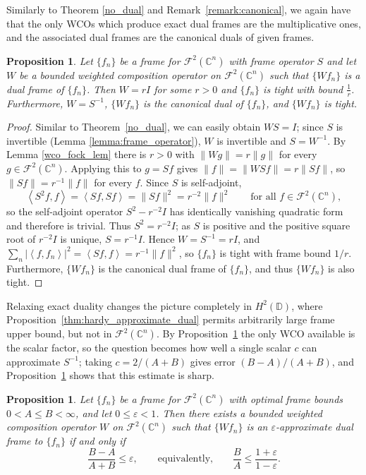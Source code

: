 \documentclass{amsart}
\newtheorem{prop}[thm]{Proposition}
\theoremstyle{definition}
\theoremstyle{remark}
\numberwithin{equation}{section}
\newcommand{\ip}[2]{\left\langle {#1} , {#2} \right\rangle} %
\newcommand{\C}{\mathbb{C}} %
\newcommand{\D}{\mathbb{D}} %
\begin{document}
Similarly to Theorem \ref{no_dual} and Remark~\ref{remark:canonical}, we again have that the only WCOs which produce exact dual frames are the multiplicative ones, and the associated dual frames are the canonical duals of given frames. 
\begin{prop}\label{fock_tight}
Let $\{f_n\}$ be a frame for $\mathcal{F}^2(\C^n)$ with frame operator $S$ and let $W$ be a bounded weighted composition operator on $\mathcal{F}^2(\C^n)$ such that $\{Wf_n\}$ is a dual frame of $\{f_n\}$.  Then $W=rI$ for some $r>0$ and $\{f_n\}$ is tight with bound $\frac{1}{r}$. Furthermore, $W=S^{-1}$, $\{ Wf_n\}$ is the canonical dual of $\{f_{n}\}$, and $\{ Wf_n\}$ is tight.
\end{prop}
\begin{proof}
Similar to Theorem~\ref{no_dual}, we can easily obtain $WS=I$; since $S$ is invertible
(Lemma \ref{lemma:frame_operator}), $W$ is invertible and $S=W^{-1}$.  By Lemma
\ref{wco_fock_lem} there is $r>0$ with $\|Wg\|=r\|g\|$ for every
$g\in \mathcal{F}^{2}(\C^{n})$.  Applying this to $g=Sf$ gives
$\|f\|=\|WSf\|=r\|Sf\|$, so $\|Sf\|=r^{-1}\|f\|$ for every $f$.  Since $S$ is
self-adjoint,
\[
  \ip{S^{2}f}{f}=\ip{Sf}{Sf}=\|Sf\|^{2}=r^{-2}\|f\|^{2}
  \qquad\text{for all }f\in \mathcal{F}^{2}(\C^{n}),
\]
so the self-adjoint operator $S^{2}-r^{-2}I$ has identically vanishing quadratic
form and therefore is trivial.  Thus $S^{2}=r^{-2}I$; as $S$ is positive and the
positive square root of $r^{-2}I$ is unique, $S=r^{-1}I$.  Hence
$W=S^{-1}=rI$, and
$\sum_n|\ip{f}{f_n}|^{2}=\ip{Sf}{f}=r^{-1}\|f\|^{2}$, so $\{f_n\}$ is tight with
frame bound $1/r$. Furthermore, $\{ Wf_n\}$ is the canonical dual frame of $\{f_{n}\}$, and thus $\{ Wf_n\}$ is also tight.
\end{proof}
Relaxing exact duality changes the picture completely in $H^2(\D)$, where Proposition~\ref{thm:hardy_approximate_dual} permits arbitrarily large frame upper bound, but not in $\mathcal{F}^2(\C^n)$. By Proposition~\ref{fock_main} the only WCO available is the scalar factor, so the question becomes how well a single scalar $c$ can approximate $S^{-1}$; taking $c=2/(A+B)$ gives
error $(B-A)/(A+B)$, and Proposition~\ref{fock_main} shows that this estimate is sharp.
\begin{prop}\label{fock_main}
Let $\{f_n\}$ be a frame for $\mathcal{F}^2(\mathbb{C}^n)$ with optimal frame
bounds $0 < A \le B < \infty$, and let $0 \le \varepsilon < 1$. Then
there exists a bounded weighted composition operator $W$ on
$\mathcal{F}^2(\mathbb{C}^n)$ such that $\{Wf_n\}$ is an
$\varepsilon$-approximate dual frame to $\{f_n\}$ if and only if
\[
\frac{B - A}{A + B} \le \varepsilon,
\qquad\text{equivalently,}\qquad
\frac{B}{A} \le \frac{1 + \varepsilon}{1 - \varepsilon}.
\]
\end{prop}
\end{document}
